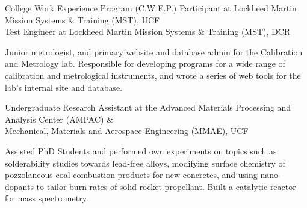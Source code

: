 \documentclass[]{resume-openfont} %
\newif\ifweb %
\begin{document}
\begin{minipage}[t]{0.65\textwidth}
\ifweb
\runsubsection{Evenly}{http://evenly.com}
\descript{| Front-end Web Developer}
\location{September 2014 | San Francisco, CA}
\begin{tightemize}
\item Front-end web developer, javascript, UI and splash page.
\item Evenly was recently acquired by Square and became \href{https://square.com/cash}{Square Cash}.
\end{tightemize}
\sectionsep
\fi

College Work Experience Program (C.W.E.P.) Participant at Lockheed Martin Mission Systems \& Training (MST), UCF\\
Test Engineer at Lockheed Martin Mission Systems \& Training (MST), DCR\\
\begin{tightemize}
\item Junior  metrologist,  and  primary  website  and  database  admin  for  the Calibration and Metrology lab.
\ifweb\item\fi Responsible for developing programs for a wide range of calibration and metrological instruments, and wrote a series of web tools for the lab's internal site and database.
\end{tightemize}
\sectionsep

Undergraduate Research Assistant at the Advanced Materials Processing and Analysis Center (AMPAC) \&\\
Mechanical, Materials and Aerospace Engineering (MMAE), UCF\\
\begin{tightemize}
\item Assisted  PhD  Students  and  performed  own  experiments  on  topics  such  as solderability studies towards lead-free alloys, modifying surface chemistry of pozzolaneous coal combustion products for new concretes, and using nano-dopants to tailor burn rates of solid rocket propellant.
\ifweb\item\fi Built a \href{http://sudipta-seal.ucf.edu/images/photos/characterization/Catalytic-Reactor.jpg}{catalytic reactor} for mass spectrometry.
\end{tightemize}


\end{minipage}
\end{document}
